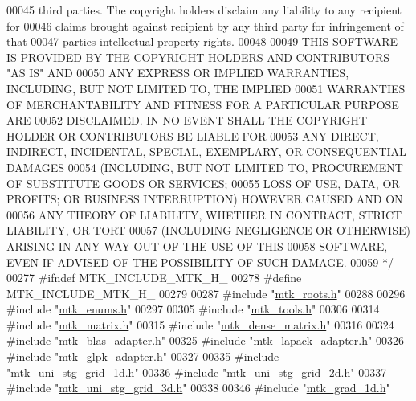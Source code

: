 \begin{DoxyCode}
00045 \textcolor{comment}{third parties. The copyright holders disclaim any liability to any recipient for}
00046 \textcolor{comment}{claims brought against recipient by any third party for infringement of that}
00047 \textcolor{comment}{parties intellectual property rights.}
00048 \textcolor{comment}{}
00049 \textcolor{comment}{THIS SOFTWARE IS PROVIDED BY THE COPYRIGHT HOLDERS AND CONTRIBUTORS "AS IS" AND}
00050 \textcolor{comment}{ANY EXPRESS OR IMPLIED WARRANTIES, INCLUDING, BUT NOT LIMITED TO, THE IMPLIED}
00051 \textcolor{comment}{WARRANTIES OF MERCHANTABILITY AND FITNESS FOR A PARTICULAR PURPOSE ARE}
00052 \textcolor{comment}{DISCLAIMED. IN NO EVENT SHALL THE COPYRIGHT HOLDER OR CONTRIBUTORS BE LIABLE FOR}
00053 \textcolor{comment}{ANY DIRECT, INDIRECT, INCIDENTAL, SPECIAL, EXEMPLARY, OR CONSEQUENTIAL DAMAGES}
00054 \textcolor{comment}{(INCLUDING, BUT NOT LIMITED TO, PROCUREMENT OF SUBSTITUTE GOODS OR SERVICES;}
00055 \textcolor{comment}{LOSS OF USE, DATA, OR PROFITS; OR BUSINESS INTERRUPTION) HOWEVER CAUSED AND ON}
00056 \textcolor{comment}{ANY THEORY OF LIABILITY, WHETHER IN CONTRACT, STRICT LIABILITY, OR TORT}
00057 \textcolor{comment}{(INCLUDING NEGLIGENCE OR OTHERWISE) ARISING IN ANY WAY OUT OF THE USE OF THIS}
00058 \textcolor{comment}{SOFTWARE, EVEN IF ADVISED OF THE POSSIBILITY OF SUCH DAMAGE.}
00059 \textcolor{comment}{*/}
00277 \textcolor{preprocessor}{#ifndef MTK\_INCLUDE\_MTK\_H\_}
00278 \textcolor{preprocessor}{#define MTK\_INCLUDE\_MTK\_H\_}
00279 
00287 \textcolor{preprocessor}{#include "\hyperlink{mtk__roots_8h}{mtk\_roots.h}"}
00288 
00296 \textcolor{preprocessor}{#include "\hyperlink{mtk__enums_8h}{mtk\_enums.h}"}
00297 
00305 \textcolor{preprocessor}{#include "\hyperlink{mtk__tools_8h}{mtk\_tools.h}"}
00306 
00314 \textcolor{preprocessor}{#include "\hyperlink{mtk__matrix_8h}{mtk\_matrix.h}"}
00315 \textcolor{preprocessor}{#include "\hyperlink{mtk__dense__matrix_8h}{mtk\_dense\_matrix.h}"}
00316 
00324 \textcolor{preprocessor}{#include "\hyperlink{mtk__blas__adapter_8h}{mtk\_blas\_adapter.h}"}
00325 \textcolor{preprocessor}{#include "\hyperlink{mtk__lapack__adapter_8h}{mtk\_lapack\_adapter.h}"}
00326 \textcolor{preprocessor}{#include "\hyperlink{mtk__glpk__adapter_8h}{mtk\_glpk\_adapter.h}"}
00327 
00335 \textcolor{preprocessor}{#include "\hyperlink{mtk__uni__stg__grid__1d_8h}{mtk\_uni\_stg\_grid\_1d.h}"}
00336 \textcolor{preprocessor}{#include "\hyperlink{mtk__uni__stg__grid__2d_8h}{mtk\_uni\_stg\_grid\_2d.h}"}
00337 \textcolor{preprocessor}{#include "\hyperlink{mtk__uni__stg__grid__3d_8h}{mtk\_uni\_stg\_grid\_3d.h}"}
00338 
00346 \textcolor{preprocessor}{#include "\hyperlink{mtk__grad__1d_8h}{mtk\_grad\_1d.h}"}

\end{DoxyCode}
